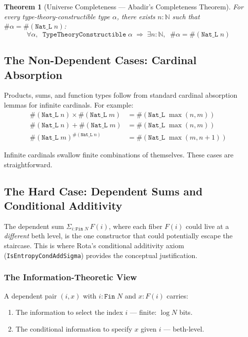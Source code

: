 \documentclass{report}
\newtheorem{theorem}{Theorem}
\begin{document}
\begin{theorem}[Universe Completeness --- Abadir's Completeness Theorem]
\label{thm:completeness}
For every type-theory-constructible type $\alpha$, there exists $n : \mathbb{N}$
such that $\#\alpha = \#(\texttt{Nat\_L}\; n)$:
$$\forall \alpha,\;\; \texttt{TypeTheoryConstructible}\;\alpha \;\Longrightarrow\;
  \exists n : \mathbb{N},\;\; \#\alpha = \#(\texttt{Nat\_L}\; n)$$
\end{theorem}

\subsection{The Non-Dependent Cases: Cardinal Absorption}

Products, sums, and function types follow from standard cardinal absorption
lemmas for infinite cardinals. For example:
\begin{align*}
\#(\texttt{Nat\_L}\; n) \times \#(\texttt{Nat\_L}\; m) &= \#(\texttt{Nat\_L}\; \max(n, m)) \\
\#(\texttt{Nat\_L}\; n) + \#(\texttt{Nat\_L}\; m) &= \#(\texttt{Nat\_L}\; \max(n, m)) \\
\#(\texttt{Nat\_L}\; m)^{\#(\texttt{Nat\_L}\; n)} &= \#(\texttt{Nat\_L}\; \max(m, n+1))
\end{align*}

Infinite cardinals swallow finite combinations of themselves. These cases
are straightforward.

\subsection{The Hard Case: Dependent Sums and Conditional Additivity}

The dependent sum $\Sigma_{i : \texttt{Fin}\; N}\, F(i)$, where each fiber
$F(i)$ could live at a \emph{different} beth level, is the one constructor
that could potentially escape the staircase. This is where Rota's conditional
additivity axiom (\texttt{IsEntropyCondAddSigma}) provides the conceptual
justification.

\subsubsection{The Information-Theoretic View}

A dependent pair $(i, x)$ with $i : \texttt{Fin}\; N$ and $x : F(i)$ carries:
\begin{enumerate}
\item The information to select the index $i$ --- finite: $\log N$ bits.
\item The conditional information to specify $x$ given $i$ --- beth-level.
\end{enumerate}
\end{document}
